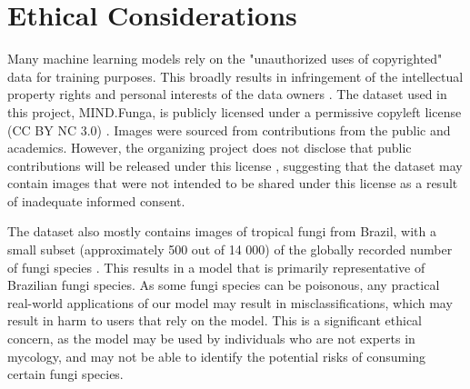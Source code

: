 \documentclass{article} %
\begin{document}
\section{Ethical Considerations}
\label{sec:ethics}
Many machine learning models rely on the "unauthorized uses of copyrighted" data for training purposes. This broadly results in infringement of the intellectual property rights and personal interests of the data owners \citep{Sobel.TaxonomyTrainingData.2021}. The dataset used in this project, MIND.Funga, is publicly licensed under a permissive copyleft license (CC BY NC 3.0) \citep{Drechsler-SantosKarstedtEtAl.MINDFunga.2023}. Images were sourced from contributions from the public and academics. However, the organizing project does not disclose that public contributions will be released under this license \citep{Drechsler-SantosKarstedtEtAl.MINDFunga.2023}, suggesting that the dataset may contain images that were not intended to be shared under this license as a result of inadequate informed consent.

The dataset also mostly contains images of tropical fungi from Brazil, with a small subset (approximately 500 out of 14 000) of the globally recorded number of fungi species \citep{LuckingAimeEtAl.UnambiguousIdentificationFungi.2020}. This results in a model that is primarily representative of Brazilian fungi species. As some fungi species can be poisonous, any practical real-world applications of our model may result in misclassifications, which may result in harm to users that rely on the model. This is a significant ethical concern, as the model may be used by individuals who are not experts in mycology, and may not be able to identify the potential risks of consuming certain fungi species.

\label{last_page}



\end{document}
